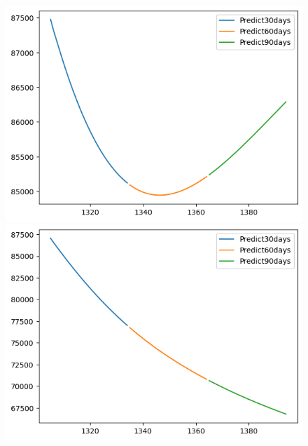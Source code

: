 \begin{figure}[H]
\begin{minipage}{0.15\textwidth}
    \includegraphics[width=1\textwidth]{resources/chapter-5/newdata1/predicted/VCB_GRU_8_2_30days.png}
    \end{minipage}
    \hfill
        \begin{minipage}{0.15\textwidth}
    \centering
    \includegraphics[width=1\textwidth]{resources/chapter-5/newdata1/predicted/VCB_GRU_9_1_30days.png}
    \end{minipage}
    \hfill
    \begin{minipage}{0.15\textwidth}
    \centering

\end{minipage}
\end{figure}

